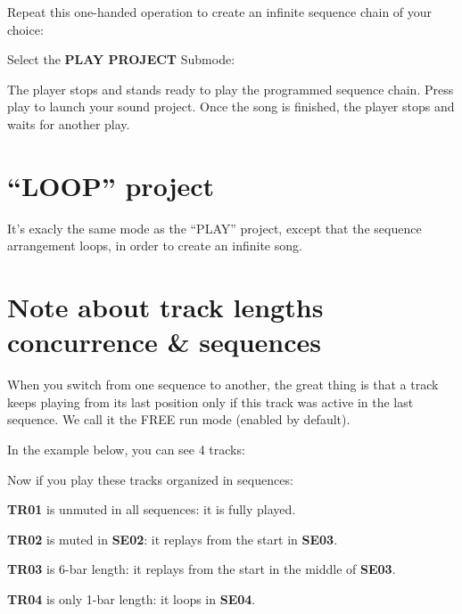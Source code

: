 
Repeat this one-handed operation to create an infinite sequence chain of your choice:


Select the \textbf{PLAY PROJECT} Submode:


The player stops and stands ready to play the programmed sequence chain. Press play \playicon{} to launch your sound project. Once the song is finished, the player stops and waits for another play.



\section{``LOOP'' project}

It's exacly the same mode as the ``PLAY'' project, except that the sequence arrangement loops, in order to create an infinite song.



\section{Note about track lengths concurrence \& sequences}

When you switch from one sequence to another, the great thing is that a track keeps playing from its last position only if this track was active in the last sequence. We call it the FREE run mode (enabled by default).

In the example below, you can see 4 tracks:


Now if you play these tracks organized in sequences:


\textbf{TR01} is unmuted in all sequences: it is fully played.

\textbf{TR02} is muted in \textbf{SE02}: it replays from the start in \textbf{SE03}.

\textbf{TR03} is 6-bar length: it replays from the start in the middle of \textbf{SE03}.

\textbf{TR04} is only 1-bar length: it loops in \textbf{SE04}.


